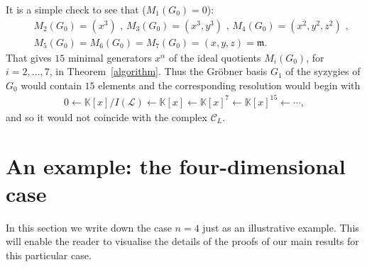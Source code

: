 \documentclass[ALCO]{cedram}
\newcommand{\mbk}{\mbox{$\mathbb{K}$}}
\newcommand{\mcc}{\mbox{$\mathcal{C}$}}
\newcommand{\mcl}{\mbox{$\mathcal{L}$}}
\newcommand{\mfm}{\mbox{$\mathfrak{m}$}}
\begin{document}
\begin{remark}
It is a simple check to see that ($M_1(G_0)=0$):
\begin{eqnarray*}
&&M_2(G_0)=(x^3)\mbox{ , }
M_3(G_0)=(x^3,y^3)\mbox{ , }
M_4(G_0)=(x^2,y^2,z^2)\mbox{ , }\\
&&M_5(G_0)=M_6(G_0)=M_7(G_0)=(x,y,z)=\mfm.
\end{eqnarray*}
That gives $15$ minimal generators $x^\alpha$ of the ideal quotients
$M_i(G_0)$, for $i=2,\ldots ,7$, in Theorem~\ref{algorithm}.  Thus the
Gr\"obner basis $G_1$ of the syzygies of $G_0$ would contain $15$
elements and the corresponding resolution would begin with
\begin{eqnarray*}
0\leftarrow \mbk[x]/I(\mcl)\leftarrow
\mbk[x]\leftarrow\mbk[x]^{7}\leftarrow \mbk[x]^{15}\leftarrow\cdots ,
\end{eqnarray*}
and so it would not coincide with the complex $\mcc_{L}$.
\end{remark}

\section{An example: the four-dimensional case}

In this section we write down the case $n=4$ just as an illustrative
example. This will enable the reader to visualise the details of the
proofs of our main results for this particular case.
\end{document}
